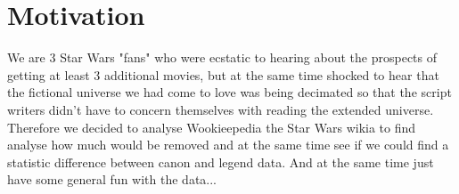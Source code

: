 \section{Motivation}
We are 3 Star Wars "fans" who were ecstatic to hearing about the prospects of getting at least 3 additional movies, but at the same time shocked to  hear that the fictional universe we had come to love was being decimated so that the script writers didn't have to concern themselves with reading the extended universe.\\
\- Therefore we decided to analyse Wookieepedia the Star Wars wikia to find analyse how much would be removed and at the same time see if we could find a statistic difference between canon and legend data. And at the same time just have some general fun with the data...